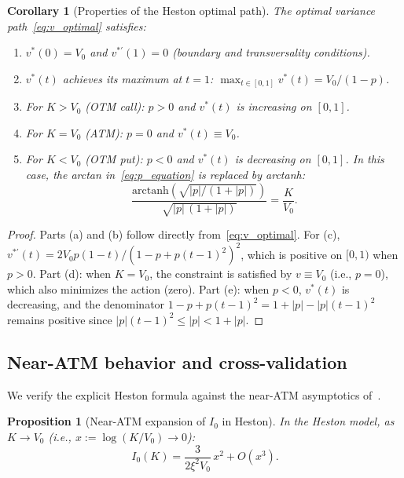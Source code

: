 \documentclass[11pt]{article}
\newtheorem{proposition}[theorem]{Proposition}
\newtheorem{corollary}[theorem]{Corollary}
\theoremstyle{definition}
\begin{document}
\begin{corollary}[Properties of the Heston optimal path]\label{cor:heston_properties}
The optimal variance path~\eqref{eq:v_optimal} satisfies:
\begin{enumerate}[label=(\alph*)]
  \item $v^*(0) = V_0$ and $v^{*\prime}(1) = 0$ (boundary and transversality conditions).
  \item $v^*(t)$ achieves its maximum at $t = 1$: $\max_{t \in [0,1]} v^*(t) = V_0/(1-p)$.
  \item For $K > V_0$ (OTM call): $p > 0$ and $v^*(t)$ is increasing on $[0,1]$.
  \item For $K = V_0$ (ATM): $p = 0$ and $v^*(t) \equiv V_0$.
  \item For $K < V_0$ (OTM put): $p < 0$ and $v^*(t)$ is decreasing on $[0,1]$. In this case, the arctan in~\eqref{eq:p_equation} is replaced by arctanh:
  \begin{equation}\label{eq:p_put}
    \frac{\mathrm{arctanh}\!\left(\sqrt{|p|/(1+|p|)}\right)}{\sqrt{|p|\,(1+|p|)}} = \frac{K}{V_0}.
  \end{equation}
\end{enumerate}
\end{corollary}

\begin{proof}
Parts (a) and (b) follow directly from~\eqref{eq:v_optimal}. For (c), $v^{*\prime}(t) = 2V_0 p(1-t)/(1-p+p(t-1)^2)^2$, which is positive on $[0,1)$ when $p > 0$. Part (d): when $K = V_0$, the constraint is satisfied by $v \equiv V_0$ (i.e., $p = 0$), which also minimizes the action (zero). Part (e): when $p < 0$, $v^*(t)$ is decreasing, and the denominator $1 - p + p(t-1)^2 = 1 + |p| - |p|(t-1)^2$ remains positive since $|p|(t-1)^2 \leq |p| < 1 + |p|$.
\end{proof}

\subsection{Near-ATM behavior and cross-validation}\label{sec:heston_nearATM}

We verify the explicit Heston formula against the near-ATM asymptotics of~\cite{PWZ2025}.

\begin{proposition}[Near-ATM expansion of $I_0$ in Heston]\label{prop:heston_nearATM}
In the Heston model, as $K \to V_0$ (i.e., $x := \log(K/V_0) \to 0$):
\begin{equation}\label{eq:heston_nearATM}
  I_0(K) = \frac{3}{2\xi^2 V_0}\,x^2 + O(x^3).
\end{equation}
\end{proposition}
\end{document}
